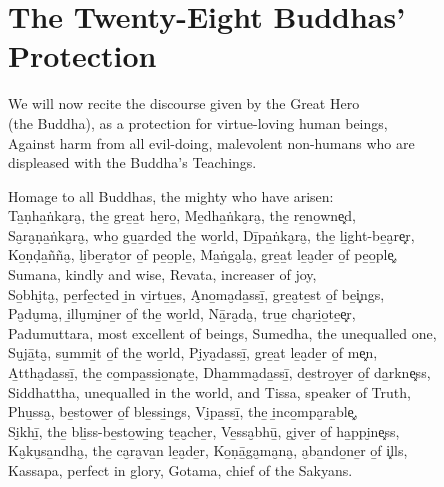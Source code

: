 \chapterTocDelegatePageNumber
\chapter{The Twenty-Eight Buddhas' Protection}

\setTocDelegatedPageNumber

\vspace*{5pt}

{\setlength{\parskip}{0pt}%

\begin{soloonechants}
We will now recite the discourse given by the Great Hero\\
(the Buddha), as a protection for virtue-loving human beings,\\
Against harm from all evil-doing, malevolent non-humans who are\\
displeased with the Buddha's Teachings.\\
\end{soloonechants}%
}

\vspace*{-2pt}

\englishText

\begin{onechants}
Homage to all Buddhas, the mighty who have arisen:\\
Ta̱ṇha̱ṅka̮ra̮, the̱ gre̱a̱t he̱ro̱, Me̱dha̱ṅka̮ra̮, the̱ re̱no̱wne͓d,\\
Sa̮ra̮ṇa̱ṅka̮ra̮, who̱ gu̱a̱rde̱d the̱ wo̱rld, Dī̱pa̱ṅka̮ra̮, the̱ li̱ght-be̱a̮re͓r,\\
Ko̱ṇḍa̱ñña̮, li̮be̱ra̮to̱r o̱f pe̱o̱ple̱, Ma̱ṅga̮la̮, gre̱a̱t le̱a̮de̱r o̱f pe̱o̱ple͓,\\
Sumana, kindly and wise, Revata, increaser of joy,\\
So̱bhi̮ta̮, pe̱rfe̱cte̱d i̱n vi̱rtu̱e̱s, A̮no̱ma̮da̱ssī̱, gre̱a̮te̱st o̱f be̱i͓ngs,\\
Pa̮du̮ma̮, i̱llu̮mi̮ne̱r o̱f the̱ wo̱rld, Nā̱ra̮da̮, tru̱e̱ cha̮ri̱o̱te̱e͓r,\\
Padumuttara, most excellent of beings, Sumedha, the unequalled one,\\
Su̮jā̱ta̮, su̱mmi̱t o̱f the̱ wo̱rld,  Pi̮ya̮da̱ssī̱, gre̱a̱t le̱a̮de̱r o̱f me͓n,\\
A̱ttha̮da̱ssī̱, the̱ co̱mpa̱ssi̱o̱na̮te̱, Dha̱mma̮da̱ssī̱, de̱stro̱ye̱r o̱f da̱rkne͓ss,\\
Siddhattha, unequalled in the world,  and Tissa, speaker of Truth,\\
Phu̱ssa̮, be̱sto̱we̱r o̱f ble̱ssi̱ngs, Vi̮pa̱ssī̱, the̱ i̱nco̱mpa̮ra̱ble͓,\\
Si̮khī̱, the̱ bli̱ss-be̱sto̱wi̱ng te̱a̮che̱r, Ve̱ssa̮bhū̱, gi̮ve̱r o̱f ha̱ppi̮ne͓ss,\\
Ka̮ku̮sa̱ndha̮, the̱ ca̮ra̮va̱n le̱a̮de̱r, Ko̱ṇā̱ga̮ma̮na̮, a̮ba̱ndo̱ne̱r o̱f i͓lls,\\
Kassapa, perfect in glory, Gotama, chief of the Sakyans.\\
\end{onechants}

